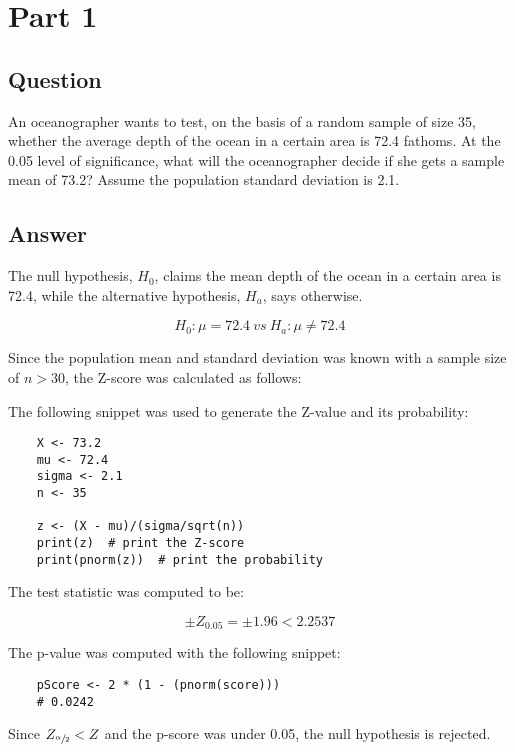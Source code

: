 \section{Part 1}
    \subsection{Question}
    An oceanographer wants to test, on the basis of a random sample of size 35, whether the average depth of the ocean in a certain area is 72.4 fathoms. At the 0.05 level of significance, what will the oceanographer decide if she gets a sample mean of 73.2? Assume the population standard deviation is 2.1.

    \subsection{Answer}
    The null hypothesis, $H_{0}$, claims the mean depth of the ocean in a certain area is 72.4, while the alternative hypothesis, $H_{a}$, says otherwise.

        \[ H_{0}: \mu = 72.4 \ vs \ H_{a}: \mu \neq 72.4 \]

    Since the population mean and standard deviation was known with a sample size of $n > 30$, the Z-score was calculated as follows:

        \newline

    The following snippet was used to generate the Z-value and its probability:
\begin{lstlisting}
    X <- 73.2
    mu <- 72.4
    sigma <- 2.1
    n <- 35

    z <- (X - mu)/(sigma/sqrt(n))
    print(z)  # print the Z-score
    print(pnorm(z))  # print the probability
\end{lstlisting}

    The test statistic was computed to be:

    \begin{equation*}
        \pm Z_{0.05}=\pm 1.96 < 2.2537
    \end{equation*}

    The p-value was computed with the following snippet:
\begin{lstlisting}
    pScore <- 2 * (1 - (pnorm(score)))
    # 0.0242
\end{lstlisting}

    Since $Z_{\sfrac{\alpha}{2}} < Z$ and the p-score was under 0.05, the null hypothesis is rejected.
